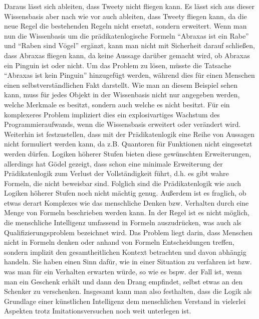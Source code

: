 Daraus lässt sich ableiten, dass Tweety nicht fliegen kann.
Es lässt sich aus dieser Wissensbasis aber nach wie vor auch ableiten, dass Tweety fliegen kann, da die neue Regel die bestehenden Regeln nicht ersetzt, sondern erweitert.
Wenn man nun die Wissenbasis um die prädikatenlogische Formeln “Abraxas ist ein Rabe” und “Raben sind Vögel” ergänzt, kann man nicht mit Sicherheit darauf schließen, dass Abraxas fliegen kann, da keine Aussage darüber gemacht wird, ob Abraxas ein Pinguin ist oder nicht.
Um das Problem zu lösen, müsste die Tatsache “Abraxas ist kein Pinguin” hinzugefügt werden, während dies für einen Menschen einen selbstverständlichen Fakt darstellt.
Wie man an diesem Beispiel sehen kann, muss für jedes Objekt in der Wissenbasis nicht nur angegeben werden, welche Merkmale es besitzt, sondern auch welche es nicht besitzt.
Für ein komplexeres Problem impliziert dies ein explosivartiges Wachstum des Programmieraufwands, wenn die Wissensbasis erweitert oder verändert wird.
Weiterhin ist festzustellen, dass mit der Prädikatenlogik eine Reihe von Aussagen nicht formuliert werden kann, da z.B.
Quantoren für Funktionen nicht eingesetzt werden dürfen.
Logiken
höherer Stufen bieten diese gewünschten Erweiterungen, allerdings hat Gödel gezeigt, dass
schon eine minimale Erweiterung der Prädikatenlogik zum Verlust der Vollständigkeit führt, d.h.
es gibt wahre Formeln, die nicht beweisbar sind.
Folglich sind die Prädikatenlogik wie auch Logiken höherer Stufen noch nicht mächtig genug.
Außerdem ist es fraglich, ob etwas derart Komplexes wie das menschliche Denken bzw.
Verhalten durch eine Menge von Formeln beschrieben werden kann.
In der Regel ist es nicht möglich, die menschliche Intelligenz umfassend in Formeln auszudrücken, was auch als Qualifizierungsproblem bezeichnet wird.
Das Problem liegt darin, dass Menschen nicht in Formeln denken oder anhand von Formeln Entscheidungen treffen, sondern implizit den gesamtheitlichen Kontext betrachten und davon abhängig handeln.
Sie haben einen Sinn dafür, wie in einer Situation zu verfahren ist bzw.
was man für ein Verhalten erwarten würde, so wie es bspw.
der Fall ist, wenn man ein Geschenk erhält und dann den Drang empfindet, selbst etwas an den Schenker zu verschenken.
Insgesamt kann man also festhalten, dass die Logik als Grundlage einer künstlichen Intelligenz dem menschlichen Verstand in vielerlei Aspekten trotz Imitationsversuchen noch weit unterlegen ist.

